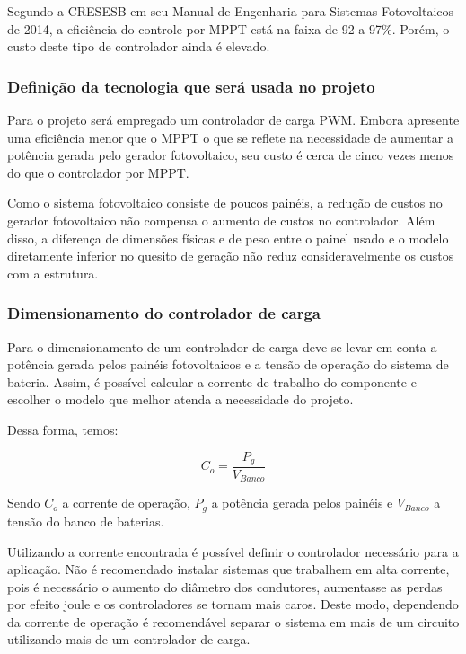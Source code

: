	Segundo a CRESESB em seu Manual de Engenharia para Sistemas Fotovoltaicos de 2014, a eficiência do controle por MPPT está na faixa de 92 a 97\%. Porém, o custo deste tipo de controlador ainda é elevado.

\subsubsection{Definição da tecnologia que será usada no projeto}	

	Para o projeto será empregado um controlador de carga PWM. Embora apresente uma eficiência menor que o MPPT o que se reflete na necessidade de aumentar a potência gerada pelo gerador fotovoltaico, seu custo é cerca de cinco vezes menos do que o controlador por MPPT.
	
	Como o sistema fotovoltaico consiste de poucos painéis, a redução de custos no gerador fotovoltaico não compensa o aumento de custos no controlador. Além disso, a diferença de dimensões físicas e de peso entre o painel usado e o modelo diretamente inferior no quesito de geração não reduz consideravelmente os custos com a estrutura.

\subsubsection{Dimensionamento do controlador de carga} 

	Para o dimensionamento de um controlador de carga deve-se levar em conta a potência gerada pelos painéis fotovoltaicos e a tensão de operação do sistema de bateria. Assim, é possível calcular a corrente de trabalho do componente e escolher o modelo que melhor atenda a necessidade do projeto.
	
	Dessa forma, temos:

\begin{equation}
C_o = \dfrac{P_g}{V_{Banco}}
\end{equation}
	
	Sendo $C_o$ a corrente de operação, $P_g$ a potência gerada pelos painéis e $V_{Banco}$ a tensão do banco de baterias.
	
	Utilizando a corrente encontrada é possível definir o controlador necessário para a aplicação. Não é recomendado instalar sistemas que trabalhem em alta corrente, pois é necessário o aumento do diâmetro dos condutores, aumentasse as perdas por efeito joule e os controladores se tornam mais caros. Deste modo, dependendo da corrente de operação é recomendável separar o sistema em mais de um circuito utilizando mais de um controlador de carga.

